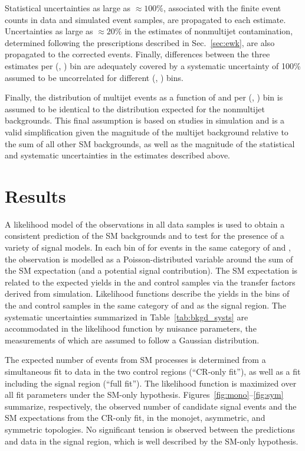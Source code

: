 Statistical uncertainties as large as ${\approx}100\%$, associated
with the finite event counts in data and simulated event samples, are
propagated to each estimate. Uncertainties as large as ${\approx}20\%$
in the estimates of nonmultijet contamination, determined following
the prescriptions described in Sec.~\ref{sec:ewk}, are also propagated
to the corrected events. Finally, differences between the three
estimates per (\njet, \scalht) bin are adequately covered by a
systematic uncertainty of 100\% assumed to be uncorrelated for
different (\njet, \scalht) bins.

Finally, the distribution of multijet events as a function of \nb and
\mht per (\njet, \scalht) bin is assumed to be identical to the
distribution expected for the nonmultijet backgrounds. This final
assumption is based on studies in simulation and is a valid
simplification given the magnitude of the multijet background relative
to the sum of all other SM backgrounds, as well as the magnitude of
the statistical and systematic uncertainties in the estimates
described above.


\section{Results}
\label{sec:result}

A likelihood model of the observations in all data samples is used to
obtain a consistent prediction of the SM backgrounds and to test for
the presence of a variety of signal models.  In each bin of \scalht
for events in the same category of \njet and \nb, the observation is
modelled as a Poisson-distributed variable around the sum of the SM
expectation (and a potential signal contribution). The SM expectation
is related to the expected yields in the \mj and \mmj control samples
via the transfer factors derived from simulation. Likelihood functions
describe the yields in the \scalht bins of the \mj and \mmj control
samples in the same category of \njet and \nb as the signal
region. The systematic uncertainties summarized in
Table~\ref{tab:bkgd_systs} are accommodated in the likelihood function
by nuisance parameters, the measurements of which are assumed to
follow a Gaussian distribution.

The expected number of events from SM processes is determined from a
simultaneous fit to data in the two control regions (``CR-only fit''),
as well as a fit including the signal region (``full fit''). The
likelihood function is maximized over all fit parameters under the
SM-only hypothesis. Figures~\ref{fig:mono}--\ref{fig:sym} summarize,
respectively, the observed number of candidate signal events and the
SM expectations from the CR-only fit, in the monojet, asymmetric, and
symmetric topologies. No significant tension is observed between the
predictions and data in the signal region, which is well described by
the SM-only hypothesis.


